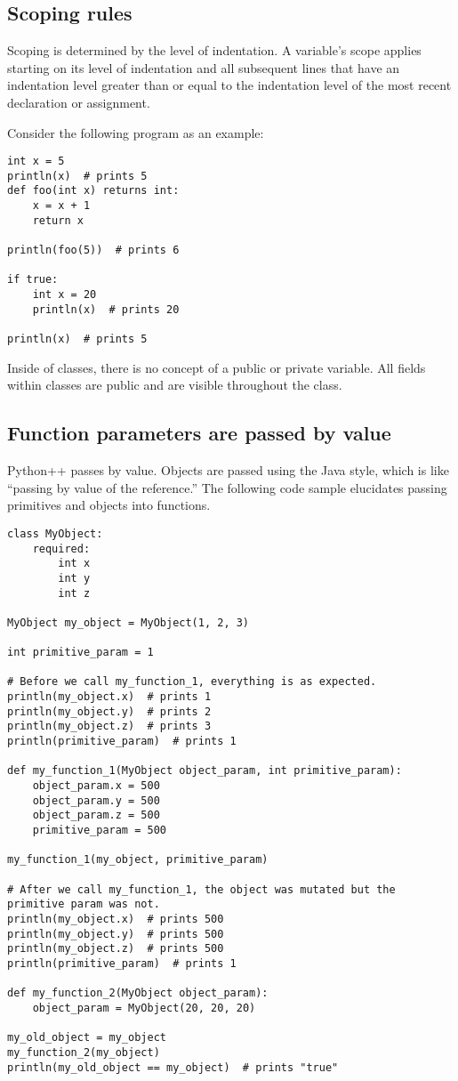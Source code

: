 \documentclass{article}
\begin{document}
\subsection{Scoping rules}
Scoping is determined by the level of indentation. A variable's scope applies starting on its level of indentation and all subsequent lines that have an indentation level greater than or equal to the indentation level of the most recent declaration or assignment.

Consider the following program as an example:

\begin{verbatim}
int x = 5
println(x)  # prints 5
def foo(int x) returns int:
    x = x + 1
    return x

println(foo(5))  # prints 6

if true:
    int x = 20
    println(x)  # prints 20
    
println(x)  # prints 5
\end{verbatim}

Inside of classes, there is no concept of a public or private variable. All fields within classes are public and are visible throughout the class.

\subsection{Function parameters are passed by value}
Python++ passes by value. Objects are passed using the Java style, which is like ``passing by value of the reference.'' The following code sample elucidates passing primitives and objects into functions. 

\begin{verbatim}
class MyObject:
    required:
        int x
        int y
        int z

MyObject my_object = MyObject(1, 2, 3)

int primitive_param = 1

# Before we call my_function_1, everything is as expected.
println(my_object.x)  # prints 1
println(my_object.y)  # prints 2
println(my_object.z)  # prints 3
println(primitive_param)  # prints 1

def my_function_1(MyObject object_param, int primitive_param):
    object_param.x = 500
    object_param.y = 500
    object_param.z = 500
    primitive_param = 500
    
my_function_1(my_object, primitive_param)

# After we call my_function_1, the object was mutated but the primitive param was not.
println(my_object.x)  # prints 500
println(my_object.y)  # prints 500
println(my_object.z)  # prints 500
println(primitive_param)  # prints 1

def my_function_2(MyObject object_param):
    object_param = MyObject(20, 20, 20)
    
my_old_object = my_object
my_function_2(my_object)
println(my_old_object == my_object)  # prints "true"
\end{verbatim}
\end{document}
